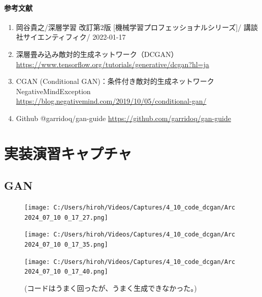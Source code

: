 \documentclass{ltjsarticle}
\begin{document}
\paragraph{参考文献}
\begin{enumerate}
  \item 岡谷貴之/深層学習 改訂第2版 [機械学習プロフェッショナルシリーズ]/ 講談社サイエンティフィク/ 2022-01-17
  \item 深層畳み込み敵対的生成ネットワーク（DCGAN）\url{https://www.tensorflow.org/tutorials/generative/dcgan?hl=ja}
  \item CGAN (Conditional GAN)：条件付き敵対的生成ネットワーク NegativeMindException \url{https://blog.negativemind.com/2019/10/05/conditional-gan/}
  \item Github @garridoq/gan-guide \url{https://github.com/garridoq/gan-guide}
\end{enumerate}

\clearpage
\section{実装演習キャプチャ}
\subsection{GAN}
\begin{figure}[htbp]
  \centering
  \texttt{[image: C:/Users/hiroh/Videos/Captures/4\_10\_code\_dcgan/Arc 2024\_07\_10 0\_17\_27.png]}
\end{figure}
\begin{figure}[htbp]
  \centering
  \texttt{[image: C:/Users/hiroh/Videos/Captures/4\_10\_code\_dcgan/Arc 2024\_07\_10 0\_17\_35.png]}
\end{figure}
\begin{figure}[htbp]
  \centering
  \texttt{[image: C:/Users/hiroh/Videos/Captures/4\_10\_code\_dcgan/Arc 2024\_07\_10 0\_17\_40.png]}
  \caption{(コードはうまく回ったが、うまく生成できなかった。)}
\end{figure}
\end{document}
